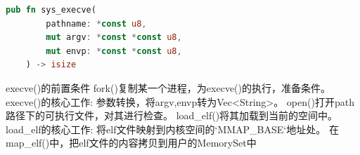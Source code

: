 \begin{lstlisting}[language=rust]
    pub fn sys_execve(
        pathname: *const u8,
        mut argv: *const *const u8,
        mut envp: *const *const u8,
    ) -> isize
\end{lstlisting}
execve()的前置条件
fork()复制某一个进程，为execve()的执行，准备条件。
execve()的核心工作:
参数转换，将argv,envp转为Vec<String>。
open()打开path路径下的可执行文件，对其进行检查。
load_elf()将其加载到当前的空间中。
load_elf的核心工作:
将elf文件映射到内核空间的`MMAP_BASE`地址处。
在map_elf()中，把elf文件的内容拷贝到用户的MemorySet中
